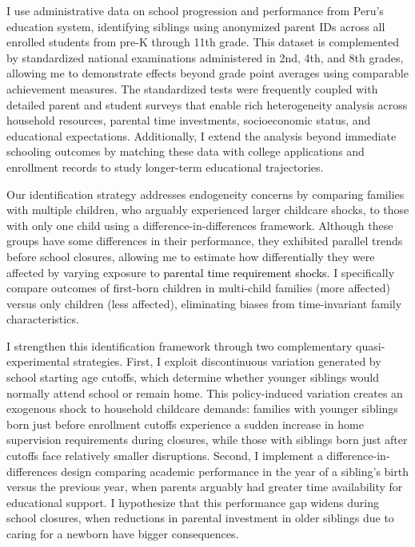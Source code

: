 

I use administrative data on school progression and performance from Peru's education system, identifying siblings using anonymized parent IDs across all enrolled students from pre-K through 11th grade. This dataset is complemented by standardized national examinations administered in 2nd, 4th, and 8th grades, allowing me to demonstrate effects beyond grade point averages using comparable achievement measures. The standardized tests were frequently coupled with detailed parent and student surveys that enable rich heterogeneity analysis across household resources, parental time investments, socioeconomic status, and educational expectations. Additionally, I extend the analysis beyond immediate schooling outcomes by matching these data with college applications and enrollment records to study longer-term educational trajectories.

Our identification strategy addresses endogeneity concerns by comparing families with multiple children, who arguably experienced larger childcare shocks, to those with only one child using a difference-in-differences framework. Although these groups have some differences in their performance, they exhibited parallel trends before school closures, allowing me to estimate how differentially they were affected by varying exposure to \textcolor{black}{parental time requirement shocks}. I specifically compare outcomes of first-born children in multi-child families (more affected) versus only children (less affected), eliminating biases from time-invariant family characteristics. 

I strengthen this identification framework through two complementary quasi-experimental strategies. First, I exploit discontinuous variation generated by school starting age cutoffs, which determine whether younger siblings would normally attend school or remain home. This policy-induced variation creates an exogenous shock to household childcare demands: families with younger siblings born just before enrollment cutoffs experience a sudden increase in home supervision requirements during closures, while those with siblings born just after cutoffs face relatively smaller disruptions. Second, I implement a difference-in-differences design comparing academic performance in the year of a sibling's birth versus the previous year, when parents arguably had greater time availability for educational support. I hypothesize that this performance gap widens during school closures, when reductions in parental investment in older siblings due to caring for a newborn have bigger consequences.


